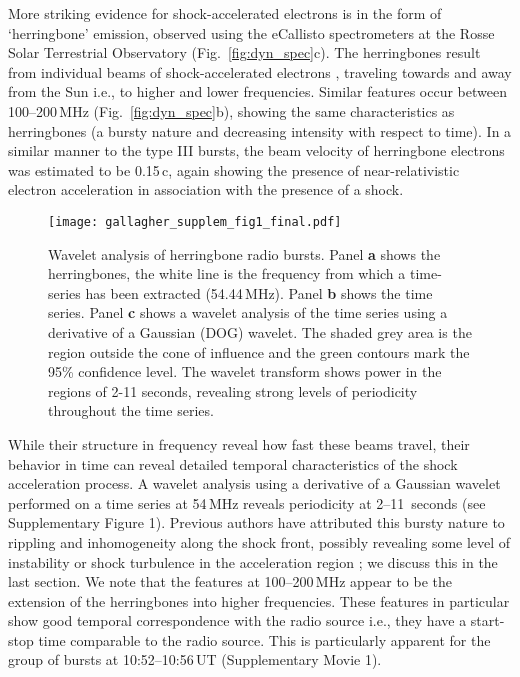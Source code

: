 More striking evidence for shock-accelerated electrons is in the form of `herringbone' emission, observed using the eCallisto spectrometers \citep{benz2009} at the Rosse Solar Terrestrial Observatory \citep[RSTO;][]{zucca2012} (Fig.~\ref{fig:dyn_spec}c). The herringbones result from individual beams of shock-accelerated electrons \citep{mann2005}, traveling towards and away from the Sun  i.e., to higher and lower frequencies. Similar features occur between 100--200\,MHz (Fig.~\ref{fig:dyn_spec}b), showing the same characteristics as herringbones (a bursty nature and decreasing intensity with respect to time). In a similar manner to the type III bursts, the beam velocity of herringbone electrons was estimated to be 0.15\,c, again showing the presence of near-relativistic electron acceleration in association with the presence of a shock. 
\begin{figure}[!t]
\begin{center}
\texttt{[image: gallagher\_supplem\_fig1\_final.pdf]}
\caption{Wavelet analysis of herringbone radio bursts. Panel {\bf a} shows the herringbones, the white line is the frequency from which a time-series has been extracted (54.44\,MHz). Panel {\bf b} shows the time series. Panel {\bf c} shows a wavelet analysis of the time series using a derivative of a Gaussian (DOG) wavelet. The shaded grey area is the region outside the cone of influence and the green contours mark the 95\% confidence level. The wavelet transform shows power in the regions of 2-11 seconds, revealing strong levels of periodicity throughout the time series.}
\label{wavelet}
\end{center}
\end{figure}

While their structure in frequency reveal how fast these beams travel, their behavior in time can reveal detailed temporal characteristics of the shock acceleration process.
A wavelet analysis using a derivative of a Gaussian wavelet performed on a time series at 54\,MHz reveals periodicity at 2--11~seconds (see Supplementary Figure 1). Previous authors have attributed this bursty nature to rippling and inhomogeneity along the shock front, possibly revealing some level of instability or shock turbulence in the acceleration region \citep{burgess2006, guo2010}; we discuss this in the last section. We note that the features at 100--200\,MHz appear to be the extension of the herringbones into higher frequencies. These features in particular show good temporal correspondence with the radio source i.e., they have a start-stop time comparable to the radio source. This is particularly apparent for the group of bursts at 10:52--10:56\,UT (Supplementary Movie 1).


